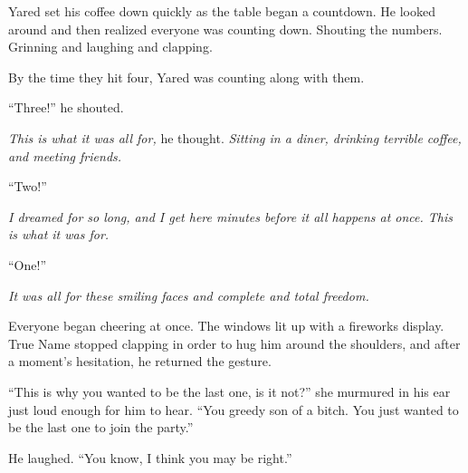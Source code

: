 Yared set his coffee down quickly as the table began a countdown. He looked around and then realized everyone was counting down. Shouting the numbers. Grinning and laughing and clapping.

By the time they hit four, Yared was counting along with them.

``Three!'' he shouted.

\emph{This is what it was all for,} he thought. \emph{Sitting in a diner, drinking terrible coffee, and meeting friends.}

``Two!''

\emph{I dreamed for so long, and I get here minutes before it all happens at once. This is what it was for.}

``One!''

\emph{It was all for these smiling faces and complete and total freedom.}

Everyone began cheering at once. The windows lit up with a fireworks display. True Name stopped clapping in order to hug him around the shoulders, and after a moment's hesitation, he returned the gesture.

``This is why you wanted to be the last one, is it not?'' she murmured in his ear just loud enough for him to hear. ``You greedy son of a bitch. You just wanted to be the last one to join the party.''

He laughed. ``You know, I think you may be right.''
